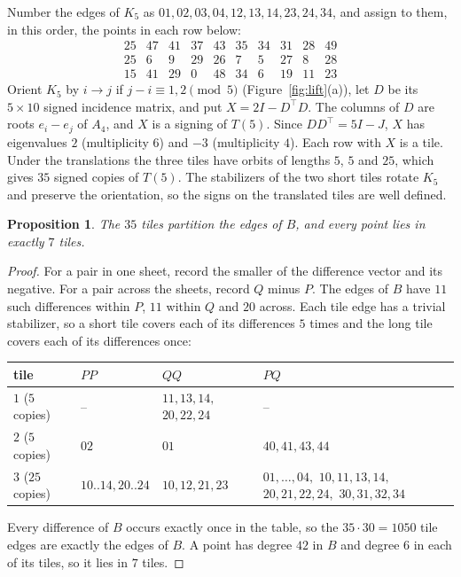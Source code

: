 \documentclass[11pt]{amsart}
\newtheorem{proposition}[theorem]{Proposition}
\theoremstyle{remark}
\begin{document}
Number the edges of $K_5$ as $01,02,03,04,12,13,14,23,24,34$, and assign to them, in this order, the points in each row below:
\[
\begin{array}{rrrrrrrrrr}
25&47&41&37&43&35&34&31&28&49\\
25&6&9&29&26&7&5&27&8&28\\
15&41&29&0&48&34&6&19&11&23
\end{array}
\]
Orient $K_5$ by $i\to j$ if $j-i\equiv1,2\pmod 5$ (Figure~\ref{fig:lift}(a)), let $D$ be its $5\times10$ signed incidence matrix, and put $X=2I-D^{\top}D$. The columns of $D$ are roots $e_i-e_j$ of $A_4$, and $X$ is a signing of $T(5)$. Since $DD^{\top}=5I-J$, $X$ has eigenvalues $2$ (multiplicity $6$) and $-3$ (multiplicity $4$). Each row with $X$ is a tile. Under the translations the three tiles have orbits of lengths $5$, $5$ and $25$, which gives $35$ signed copies of $T(5)$. The stabilizers of the two short tiles rotate $K_5$ and preserve the orientation, so the signs on the translated tiles are well defined.

\begin{proposition}\label{prop:tiling}
The $35$ tiles partition the edges of $B$, and every point lies in exactly $7$ tiles.
\end{proposition}

\begin{proof}
For a pair in one sheet, record the smaller of the difference vector and its negative. For a pair across the sheets, record $Q$ minus $P$. The edges of $B$ have $11$ such differences within $P$, $11$ within $Q$ and $20$ across. Each tile edge has a trivial stabilizer, so a short tile covers each of its differences $5$ times and the long tile covers each of its differences once:
\begin{center}\small
\begin{tabular}{llp{}p{}}
\toprule
tile & $PP$ & $QQ$ & $PQ$\\
\midrule
$1$ ($5$ copies) & -- & $11,13,14,$ $20,22,24$ & -- \\
$2$ ($5$ copies) & $02$ & $01$ & $40,41,43,44$ \\
$3$ ($25$ copies) & $10..14,20..24$ & $10,12,21,23$ & $01,\dots,04,$ $10,11,13,14,$ $20,21,22,24,$ $30,31,32,34$ \\
\bottomrule
\end{tabular}
\end{center}
Every difference of $B$ occurs exactly once in the table, so the $35\cdot30=1050$ tile edges are exactly the edges of $B$. A point has degree $42$ in $B$ and degree $6$ in each of its tiles, so it lies in $7$ tiles.
\end{proof}
\end{document}
